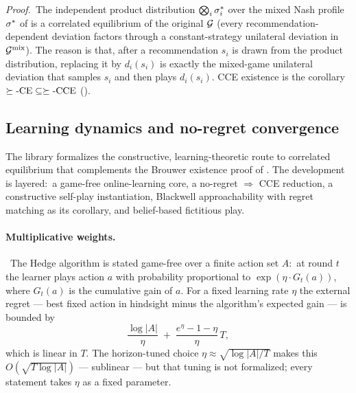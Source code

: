 \noindent\emph{Proof.}\ The independent product distribution
$\bigotimes_i \sigma^*_i$ over the mixed Nash profile
$\sigma^*$ of  is a correlated equilibrium
of the original $\mathcal{G}$ (every recommendation-dependent deviation
factors through a constant-strategy unilateral deviation in
$\mathcal{G}^{\mathrm{mix}}$).  The reason is that, after a recommendation
$s_i$ is drawn from the product distribution, replacing it by
$d_i(s_i)$ is exactly the mixed-game unilateral deviation that samples
$s_i$ and then plays $d_i(s_i)$.  CCE existence is the corollary
$\succeq\text{-CE}\subseteq\succeq\text{-CCE}$
().



\subsection{Learning dynamics and no-regret convergence}
\label{sec:theorems:learning}

The library formalizes the constructive, learning-theoretic route
to correlated equilibrium that complements the Brouwer existence
proof of .  The development
is layered:\ a game-free online-learning core, a no-regret
$\Rightarrow$ CCE reduction, a constructive self-play instantiation,
Blackwell approachability with regret matching as its corollary, and
belief-based fictitious play.

\paragraph{Multiplicative weights.}\
The Hedge algorithm is stated game-free over a finite action set
$A$:\ at round $t$ the learner plays action $a$ with probability
proportional to $\exp(\eta \cdot G_t(a))$, where $G_t(a)$ is the
cumulative gain of $a$.  For a fixed learning rate $\eta$ the
external regret — best fixed action in hindsight minus the
algorithm's expected gain — is bounded by
\[
  \frac{\log|A|}{\eta} \;+\; \frac{e^{\eta}-1-\eta}{\eta}\,T,
\]
which is linear in $T$.  The horizon-tuned choice
$\eta \approx \sqrt{\log|A|/T}$ makes this $O(\sqrt{T\log|A|})$ —
sublinear — but that tuning is not formalized; every statement takes
$\eta$ as a fixed parameter.

